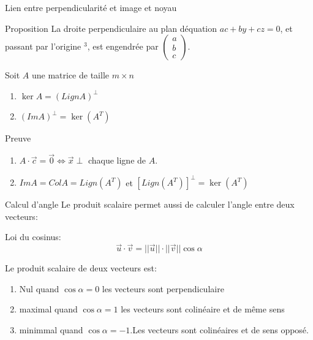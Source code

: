 \begin{parag}{Lien entre perpendicularité et image et noyau}
    \begin{subparag}{Proposition}
        La droite perpendiculaire au plan déquation $ac + by + cz = 0$, et passant par l'origine \R$^3$, est engendrée par $\begin{pmatrix}
            a \\b \\ c
        \end{pmatrix}$.
    \end{subparag}
    \begin{theoreme}
        Soit $A$ une matrice de taille $m \times n$
        \begin{enumerate}
            \item $\ker A = (LignA)^\perp$
            \item $(ImA)^\perp = \ker(A^T)$
        \end{enumerate}
    \end{theoreme}
    \begin{subparag}{Preuve}
        \begin{enumerate}
            \item $A\cdot\vec{c} = \vec{0} \Leftrightarrow \vec{x}\perp$ chaque ligne de $A$.
            \item  $ImA = ColA = Lign(A^T)$ et $[Lign(A^T)]^\perp = \ker(A^T)$
        \end{enumerate}
    \end{subparag}

\end{parag}

\begin{parag}{Calcul d'angle}
 Le produit scalaire permet aussi de calculer l'angle entre deux vecteurs:
 \begin{theoreme}
     Loi du cosinus:
     \[\vec{u}\cdot \vec{v} = ||\vec{u}||\cdot ||\vec{v}||\cos \alpha\]
 \end{theoreme}
 Le produit scalaire de deux vecteurs est:
 \begin{enumerate}
     \item Nul quand $\cos\alpha = 0$ les vecteurs sont perpendiculaire
     \item maximal quand $\cos \alpha = 1$ les vecteurs sont colinéaire et de même sens
     \item minimmal quand $\cos\alpha = -1$.Les vecteurs sont colinéaires et de sens opposé.
 \end{enumerate}
\end{parag}

